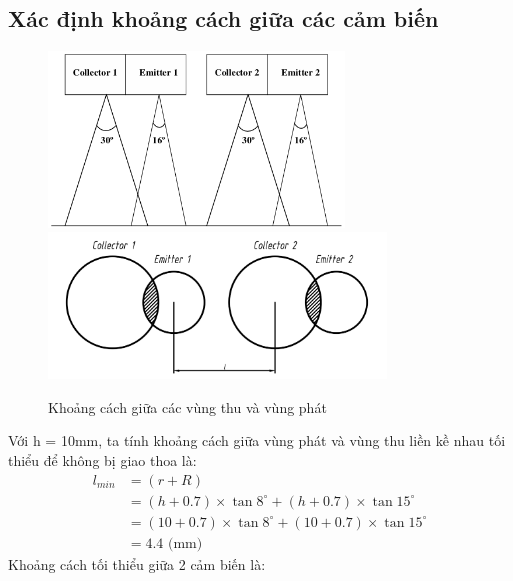         \subsection{Xác định khoảng cách giữa các cảm biến}
            \begin{figure}[H]
                \centering
                \includegraphics[width=0.7\textwidth]{pictures/chapter4/c4_p7_DistanceCollectorEmitter1.png}
                \label{fig:4-12}
                \includegraphics[width=0.8\textwidth]{pictures/chapter4/c4_p8_DistanceCollectorEmitter2.png}
                \caption{Khoảng cách giữa các vùng thu và vùng phát}
                \label{fig:4-13}
                \end{figure}
            \hspace*{0.6cm}Với h = 10mm, ta tính khoảng cách giữa vùng phát và vùng thu liền kề nhau tối thiểu để không bị giao thoa là:
            \begin{align}
                l_{min} &= (r + R) \label{eq:4-3} \\
                        &= (h +0.7) \times \tan{8^{\circ}} + (h + 0.7) \times \tan{15^{\circ}} \nonumber \\
                        &= (10 + 0.7) \times \tan{8^{\circ}} + (10 + 0.7) \times \tan{15^{\circ}} \nonumber \\
                        &= 4.4 \text{ (mm)} \nonumber
            \end{align}
            \hspace*{0.6cm}Khoảng cách tối thiểu giữa 2 cảm biến là:
